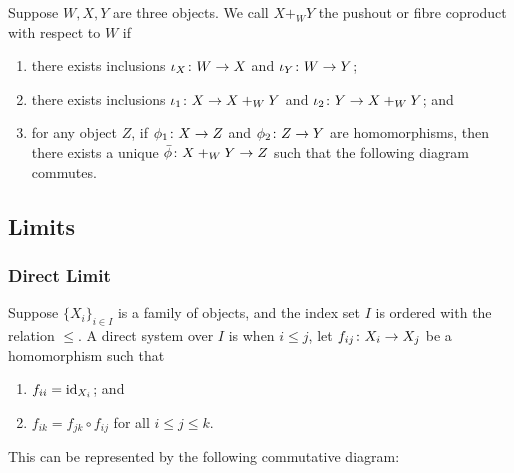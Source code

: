 \begin{definition}
    Suppose \(W,X,Y\) are three objects.
    We call \(X +_W Y\) the pushout or fibre coproduct with respect to \(W\) if
    \begin{enumerate}[label={(\roman*)}, itemsep=0mm]
        \item there exists inclusions \(\iota_X\colon W\to X\) and \(\iota_Y\colon W\to Y\);
        \item there exists inclusions \(\iota_1\colon X\to X +_W Y\)
            and \(\iota_2\colon Y\to X +_W Y\); and
        \item for any object \(Z\),
            if \(\phi_1\colon X\to Z\) and \(\phi_2\colon Z\to Y\) are homomorphisms,
            then there exists a unique \(\bar{\phi}\colon X +_W Y\to Z\)
            such that the following diagram commutes.
    \end{enumerate}
    \begin{center}
    \end{center}
\end{definition}


\subsection{Limits}

\subsubsection*{Direct Limit}

\begin{definition}
    Suppose \({\{X_i\}}_{i \in I}\) is a family of objects,
    and the index set \(I\) is ordered with the relation \(\leq\).
    A direct system over \(I\) is when \(i \leq j\),
    let \(f_{ij}\colon X_i\to X_j\) be a homomorphism such that
    \begin{enumerate}[label={(\roman*)}, itemsep=0mm]
        \item \(f_{ii} = \operatorname{id}_{X_i}\); and
        \item \(f_{ik} = f_{jk} \circ f_{ij}\) for all \(i \leq j \leq k\).
    \end{enumerate}

    This can be represented by the following commutative diagram:
    \begin{center}
    \end{center}
\end{definition}

